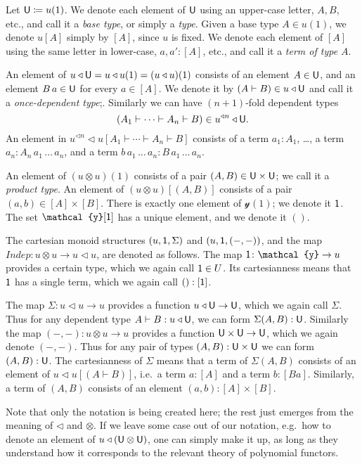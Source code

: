 \documentclass[11pt, one side, article]{memoir}
\theoremstyle{definition}
\theoremstyle{plain}
\newcommand{\Fun}[1]{\mathit{#1}}%
\newcommand{\tn}[1]{\textnormal{#1}}
\newcommand{\yon}{\mathcal{y}}
\newcommand{\0}{\textsf{0}}
\newcommand{\1}{\tn{\textsf{1}}}
\newcommand{\U}{\tn{\textsf{U}}}
\newcommand{\tri}{\mathbin{\triangleleft}}
\newcommand{\tripow}[1]{^{\tri #1}}
\newcommand{\indep}{\Fun{Indep}}
\begin{document}
Let $\U\coloneqq u(1)$. We denote each element of $\U$ using an upper-case letter, $A,B$, etc., and call it a \emph{base type}, or simply a \emph{type}. Given a base type $A\in u(1)$, we denote $u[A]$ simply by $[A]$, since $u$ is fixed. We denote each element of $[A]$ using the same letter in lower-case, $a,a':[A]$, etc., and call it a \emph{term of type $A$}. 

An element of $u\tri\U=u\tri u(1)=(u\tri u)(1)$ consists of an element $A\in\U$, and an element $B\, a\in\U$ for every $a\in [A]$. We denote it by $(A\vdash B)\in u\tri \U$ and call it a \emph{once-dependent type};. Similarly we can have $(n+1)$-fold dependent types
\[(A_1\vdash\cdots\vdash A_n\vdash B)\in u\tripow{n}\tri\U.\]
An element in $u\tripow{n}\tri u[A_1\vdash\cdots\vdash A_n\vdash B]$ consists of a term $a_1:A_1$, \dots, a term $a_n:A_n\, a_1\,\ldots\, a_n$, and a term $b\, a_1\,\ldots\, a_n:B\, a_1\,\ldots\, a_n$.

An element of $(u\otimes u)(1)$ consists of a pair $(A,B)\in\U\times\U$; we call it a \emph{product type}. An element of $(u\otimes u)[(A,B)]$ consists of a pair $(a,b)\in [A]\times[B]$. There is exactly one element of $\yon(1)$; we denote it $\1$. The set $\yon[\1]$ has a unique element, and we denote it $()$.

The cartesian monoid structures $(u,\1,\Sigma)$ and $(u,\1,(-,-))$, and the map $\indep\colon u\otimes u\to u\tri u$, are denoted as follows. The map $\1\colon\yon\to u$ provides a certain type, which we again call $\1\in U$. Its cartesianness means that $\1$ has a single term, which we again call $():[\1]$.

The map $\Sigma\colon u\tri u\to u$ provides a function $u\tri\U\to\U$, which we again call $\Sigma$. Thus for any dependent type $A\vdash B:u\tri\U$, we can form $\Sigma(A,B):\U$. Similarly the map $(-,-)\colon u\otimes u\to u$ provides a function $\U\times \U\to\U$, which we again denote $(-,-)$. Thus for any pair of types $(A,B):\U\times \U$ we can form $(A,B):\U$. The cartesianness of $\Sigma$ means that a term of $\Sigma(A,B)$ consists of an element of $u\tri u[(A\vdash B)]$, i.e.\ a term $a:[A]$ and a term $b:[Ba]$. Similarly, a term of $(A,B)$ consists of an element $(a,b):[A]\times[B]$. 

Note that only the notation is being created here; the rest just emerges from the meaning of $\tri$ and $\otimes$. If we leave some case out of our notation, e.g.\ how to denote an element of $u\tri(\U\otimes\U)$, one can simply make it up, as long as they understand how it corresponds to the relevant theory of polynomial functors.
\end{document}
